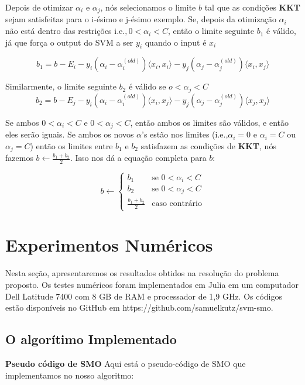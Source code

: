\documentclass{article}
\begin{document}
Depois de otimizar \(\alpha_i\) e \(\alpha_j\), nós selecionamos o limite \(b\) tal que as condições \textbf{KKT} sejam satisfeitas para o i-ésimo e j-ésimo exemplo. Se, depois da otimização \(\alpha_i\) não está dentro das restrições \(\text{i.e.}, 0<\alpha_i<C\), então o limite seguinte \(b_1\) é válido, já que força o output do SVM a ser \(y_i\) quando o input é \(x_i\)

\begin{equation}\label{b1}b_1 = b-E_i-y_i(\alpha_i-\alpha_i^{(old)})\langle x_i,x_i\rangle-y_j(\alpha_j-\alpha_j^{(old)})\langle x_i,x_j\rangle\end{equation}

Similarmente, o limite seguinte \(b_2\) é válido se \(o<\alpha_j<C\)
\begin{equation}\label{b2}b_2 = b-E_j-y_i(\alpha_i-\alpha_i^{(old)})\langle x_i,x_j\rangle-y_j(\alpha_j-\alpha_j^{(old)})\langle x_j,x_j\rangle\end{equation}

Se ambos \(0<\alpha_i<C\) e \(0<\alpha_j<C\), então ambos os limites são válidos, e então eles serão iguais.
Se ambos os novos \(\alpha\)'s estão nos limites (i.e.,\(\alpha_i=0\) e \(\alpha_i=C\) ou \(\alpha_j=C\)) então os limites entre \(b_1\) e \(b_2\) satisfazem as condições de \textbf{KKT}, nós fazemos \(b\gets\frac{b_1+b_2}{2}\). Isso nos dá a equação completa para \(b\):

\begin{equation}\label{b}
b\gets\begin{cases}b_1 &\text{se  }0<\alpha_i<C\\
b_2 &\text{se  }0<\alpha_j<C\\
\frac{b_1+b_2}{2} &\text{caso contrário}
\end{cases}
\end{equation}

\makeatletter
\def\BState{\State\hskip-\ALG@thistlm}
\makeatother

\section{Experimentos Numéricos}

Nesta seção, apresentaremos os resultados obtidos na resolução do problema proposto. Os testes numéricos foram implementados em Julia em um computador Dell Latitude 7400 com 8 GB de RAM e processador de 1,9 GHz. Os códigos estão disponíveis no GitHub em https://github.com/samuelkutz/svm-smo.

\subsection{O algorítimo Implementado}
\textbf{Pseudo código de SMO}
Aqui está o pseudo-código de SMO que implementamos no nosso algoritmo:
\end{document}
